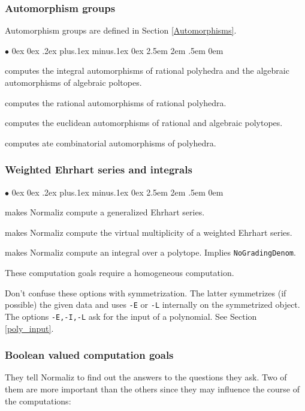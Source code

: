 \documentclass[12pt,a4paper]{scrartcl}
\newcommand{\stdli}{ \topsep0ex \partopsep0ex %
\parsep.2ex plus.1ex minus.1ex \itemsep0ex%
\leftmargin2.5em \labelwidth2em \labelsep.5em \rightmargin0em}%
\renewenvironment{itemize}{\begin{list}{{$\bullet$}}{\stdli}}{\end{list}}
\theoremstyle{definition}
\def\itemtt[#1]{\item[\textbf{\ttt{#1}}]}
\def\ttt{\texttt}
\begin{document}
\subsubsection{Automorphism groups}

Automorphism groups are defined in Section \ref{Automorphisms}.
\begin{itemize}
	\itemtt[Automorphisms] computes the integral automorphisms of rational polyhedra and the algebraic automorphisms of algebraic poltopes.
	
	\itemtt [RationalAutomorphisms] computes the rational automorphisms of rational polyhedra.
	
	\itemtt[EuclideanAutomorphisms] computes the euclidean automorphisms of rational and algebraic polytopes.
	
	\itemtt [CombinatorialAutomorphisms] computes ate combinatorial automorphisms of polyhedra.
\end{itemize}

\subsubsection{Weighted Ehrhart series and integrals}

\begin{itemize}
	
	\itemtt[WeightedEhrhartSeries, -E] makes Normaliz compute a generalized Ehrhart series.
	
	\itemtt[VirtualMultiplicity, -L] makes Normaliz compute the virtual multiplicity of a weighted Ehrhart series.
	
	\itemtt[Integral, -I] makes Normaliz compute an integral over a polytope. Implies \verb|NoGradingDenom|.	
\end{itemize}

These computation goals require a homogeneous computation.

Don't confuse these options with symmetrization. The latter symmetrizes (if possible) the given data and uses \verb|-E|  or \verb|-L| internally on the symmetrized object. The options \verb|-E,-I,-L| ask for the input of  a polynomial. See Section \ref{poly_input}.

\subsubsection{Boolean valued computation goals}\label{bool}

They tell Normaliz to find out the answers to the questions they ask. Two of them are more important than the others since they may influence the course of the computations:
\end{document}
